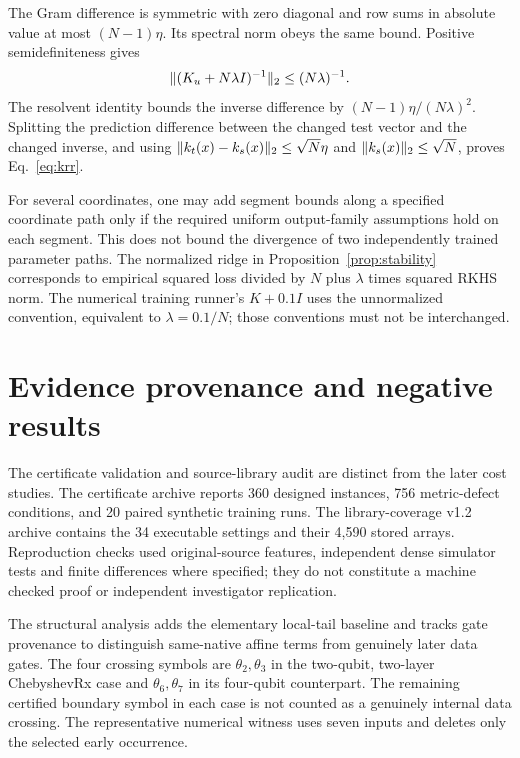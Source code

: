 The Gram difference is symmetric with zero diagonal and row sums in
absolute value at most $(N-1)\eta$. Its spectral norm obeys the
same bound. Positive semidefiniteness gives
\begin{equation}
 \lVert(K_u+N\lambda I)^{-1}\rVert_2\leq(N\lambda)^{-1}.
\end{equation}
The resolvent identity bounds the inverse difference by
$(N-1)\eta/(N\lambda)^2$. Splitting the prediction difference
between the changed test vector and the changed inverse, and using
$\lVert k_t(x)-k_s(x)\rVert_2\leq\sqrt N\eta$ and
$\lVert k_s(x)\rVert_2\leq\sqrt N$, proves Eq.~\eqref{eq:krr}.

For several coordinates, one may add segment bounds along a specified
coordinate path only if the required uniform output-family assumptions
hold on each segment. This does not bound the divergence of two
independently trained parameter paths. The normalized ridge in
Proposition~\ref{prop:stability} corresponds to empirical squared loss
divided by $N$ plus $\lambda$ times squared RKHS norm. The numerical
training runner's $K+0.1I$ uses the unnormalized convention, equivalent
to $\lambda=0.1/N$; those conventions must not be interchanged.

\section{Evidence provenance and negative results}
\label{app:evidence}
The certificate validation and source-library audit are distinct from
the later cost studies. The certificate archive reports 360 designed
instances, 756 metric-defect conditions, and 20 paired synthetic
training runs. The library-coverage v1.2 archive contains the 34
executable settings and their 4,590 stored arrays. Reproduction checks
used original-source features, independent dense simulator tests and
finite differences where specified; they do not constitute a machine
checked proof or independent investigator replication.

The structural analysis adds the elementary local-tail
baseline and tracks gate provenance to distinguish same-native affine
terms from genuinely later data gates. The four crossing symbols are
$\theta_2,\theta_3$ in the two-qubit, two-layer ChebyshevRx case and
$\theta_6,\theta_7$ in its four-qubit counterpart. The remaining
certified boundary symbol in each case is not counted as a genuinely
internal data crossing. The representative numerical witness uses
seven inputs and deletes only the selected early occurrence.

